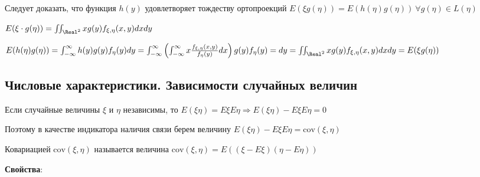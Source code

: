 Следует доказать, что функция $h(y)$ удовлетворяет тождеству ортопроекций $E(\xi g(\eta)) = E(h(\eta)g(\eta)) \ \forall g(\eta) \in L(\eta)$

$E(\xi\cdot g(\eta)) = \iint_{\Real^2} xg(y) f_{\xi,\eta}(x, y)dxdy$

$E(h(\eta)g(\eta)) = \int_{-\infty}^{\infty} h(y) g(y) f_{\eta}(y) dy = \int_{-\infty}^\infty \left(\int_{-\infty}^\infty x\frac{f_{\xi,\eta}(x, y)}{f_\eta(y)}dx\right) g(y) f_\eta(y) = dy = \iint_{\Real^2} xg(y)f_{\xi,\eta}(x, y)dxdy = E(\xi g(\eta))$

\subsection{Числовые характеристики. Зависимости случайных величин}

\Mem Если случайные величины $\xi$ и $\eta$ независимы, то $E(\xi\eta) = E\xi E\eta \Longrightarrow E(\xi\eta) - E\xi E\eta = 0$

Поэтому в качестве индикатора наличия связи берем величину $E(\xi\eta) - E\xi E\eta = \mathrm{cov}(\xi, \eta)$

\hypertarget{covariance}{}

\Def Ковариацией $\mathrm{cov}(\xi, \eta)$ называется величина $\mathrm{cov}(\xi, \eta) = E((\xi - E\xi)(\eta - E\eta))$

\mediumvspace

\textbf{Свойства}:


